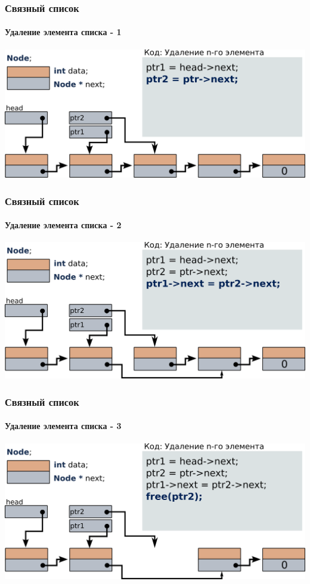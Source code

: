 \documentclass[14pt,pdf,hyperref={unicode}]{beamer}
\begin{document}
\begin{frame}[fragile]
\frametitle{Связный список} 
\framesubtitle{Удаление элемента списка - 1} 
\begin{center}
\includegraphics[width=0.99\linewidth]{images/list_delete_1.png}
\end{center}
\end{frame}
\begin{frame}[fragile]
\frametitle{Связный список} 
\framesubtitle{Удаление элемента списка - 2} 
\begin{center}
\includegraphics[width=0.99\linewidth]{images/list_delete_2.png}
\end{center}
\end{frame}
\begin{frame}[fragile]
\frametitle{Связный список} 
\framesubtitle{Удаление элемента списка - 3} 
\begin{center}
\includegraphics[width=0.99\linewidth]{images/list_delete_3.png}
\end{center}
\end{frame}
\end{document}
